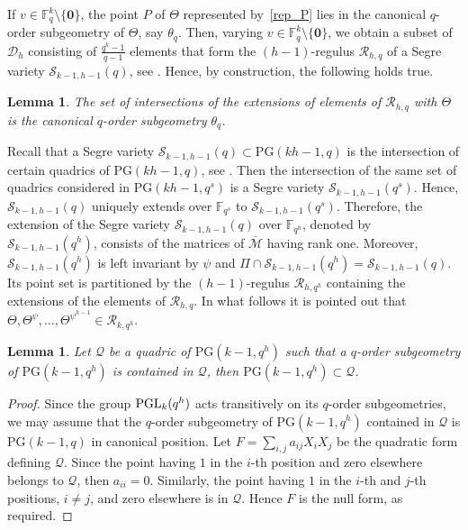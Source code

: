 \documentclass[11pt]{article}
\newtheorem{lemma}[theorem]{Lemma}
\theoremstyle{definition}
\numberwithin{equation}{section}
\def\0{\mathbf 0}
\def\cM{\mathcal M}
\def\cQ{\mathcal Q}
\def\cD{\mathcal D}
\def\cR{\mathcal R}
\def\cS{\mathcal S}
\def\PG{\mathrm{PG}}
\def\F{{\mathbb F}}
\def\PGL{{\rm PGL}}
\def\diag{{\rm diag}}
\begin{document}
If $v \in \F_{q}^k \setminus \{\0\}$, the point $P$ of $\Theta$ represented by~\eqref{rep_P} lies in the canonical $q$-order subgeometry of $\Theta$, say $\theta_q$. Then, varying $v \in \F_{q}^k \setminus \{\0\}$, we obtain a subset of $\cD_h$ consisting of $\frac{q^{k}-1}{q-1}$ elements that form the $(h-1)$-regulus $\cR_{h, q}$ of a Segre variety $\cS_{k-1, h-1}(q)$, see \cite[Theorem 2.4]{Lavrauw2015}. Hence, by construction, the following holds true.
\begin{lemma}\label{intersection}
The set of intersections of the extensions of elements of $\cR_{h, q}$ with $\Theta$ is the canonical $q$-order subgeometry $\theta_{q}$.
\end{lemma}

Recall that a Segre variety $\cS_{k-1, h-1}(q) \subset \PG(kh-1, q)$ is the intersection of certain quadrics of $\PG(kh-1, q)$, see \cite[Theorem 4.94]{HirschfeldThas}. Then the intersection of the same set of quadrics considered in $\PG(kh-1, q^s)$ is a Segre variety $\cS_{k-1, h-1}(q^s)$. Hence, $\cS_{k-1, h-1}(q)$ uniquely extends over $\F_{q^s}$ to $\cS_{k-1, h-1}(q^s)$. Therefore, the extension of the Segre variety $\cS_{k-1, h-1}(q)$ over $\F_{q^h}$, denoted by $\cS_{k-1,h-1}(q^h)$, consists of the matrices of $\overline{\cM}$ having rank one. Moreover, $\cS_{k-1, h-1}(q^h)$ is left invariant by $\psi$ and $\Pi \cap \cS_{k-1, h-1}(q^h) = \cS_{k-1, h-1}(q)$. Its point set is partitioned by the $(h-1)$-regulus $\cR_{h, q^h}$ containing the extensions of the elements of $\cR_{h, q}$. In what follows it is pointed out that $\Theta, \Theta^\psi, \dots, \Theta^{\psi^{h-1}} \in \cR_{k, q^h}$.

\begin{lemma}\label{subgeometry}
Let $\cQ$ be a quadric of $\PG(k-1, q^h)$ such that a $q$-order subgeometry of $\PG(k-1, q^h)$ is contained in $\cQ$, then $\PG(k-1, q^h) \subset \cQ$. 
\end{lemma}
\begin{proof}
Since the group $\PGL_k(q^h)$ acts transitively on its $q$-order subgeometries, we may assume that the $q$-order subgeometry of $\PG(k-1, q^h)$ contained in $\cQ$ is $\PG(k-1, q)$ in canonical position. Let $F = \sum_{i,j} a_{i j} X_i X_j$ be the quadratic form defining $\cQ$. Since the point having $1$ in the $i$-th position and zero elsewhere belongs to $\cQ$, then $a_{i i} = 0$. Similarly, the point having $1$ in the $i$-th and $j$-th positions, $i \ne j$, and zero elsewhere is in $\cQ$. Hence $F$ is the null form, as required.
\end{proof}
\end{document}
